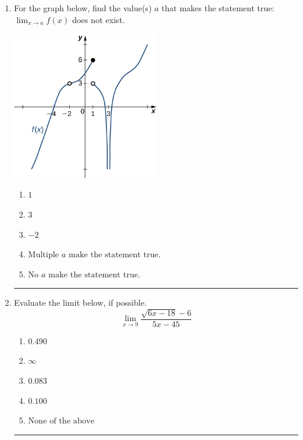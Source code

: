 \documentclass[14pt]{extbook}
\newcommand{\litem}[1]{\item#1\hspace*{-1cm}\rule{\textwidth}{0.4pt}}
\begin{document}
\begin{enumerate}
{\begin{enumerate}[label=\Alph*.]
\end{enumerate} }
\litem{
For the graph below, find the value(s) $a$ that makes the statement true: $ \displaystyle \lim_{x \rightarrow a} f(x)$ does not exist.
\begin{center}
    \includegraphics[width=0.5\textwidth]{../Figures/evaluateLimitGraphicallyCopyC.png}
\end{center}
\begin{enumerate}[label=\Alph*.]
\item \( 1 \)
\item \( 3 \)
\item \( -2 \)
\item \( \text{Multiple } a \text{ make the statement true}. \)
\item \( \text{No } a \text{ make the statement true}. \)

\end{enumerate} }
\litem{
Evaluate the limit below, if possible.\[ \lim_{x \rightarrow 9} \frac{\sqrt{6x - 18} - 6}{5x - 45} \]\begin{enumerate}[label=\Alph*.]
\item \( 0.490 \)
\item \( \infty \)
\item \( 0.083 \)
\item \( 0.100 \)
\item \( \text{None of the above} \)


\end{enumerate}}
\end{enumerate}
\end{document}
